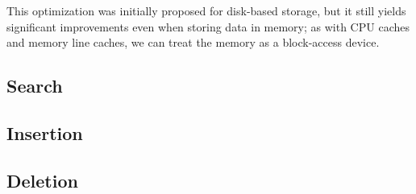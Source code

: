 This optimization was initially proposed for disk-based storage, but it still yields significant improvements even when storing data in memory; as with CPU caches and memory line caches, we can treat the memory as a block-access device.

\subsection{Search}


\subsection{Insertion}


\subsection{Deletion}


